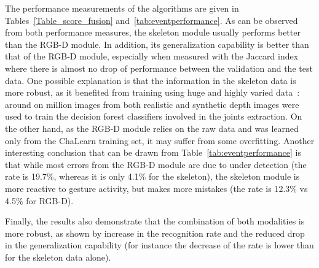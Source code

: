%
The performance measurements  of the algorithms are given in Tables~\ref{Table_score_fusion} and~\ref{tab:eventperformance}.
%
As can be observed from both performance measures, the skeleton module usually  performs better than the RGB-D module.
In addition, its generalization capability  is better than that of the RGB-D module,
especially when measured with the Jaccard index where there is almost no drop of performance between the validation and the test data.
%
One possible explanation is that the information in the skeleton data is more robust, as it benefited from training using huge and highly
varied data~\cite{shotton2011real}: around on million images from both realistic and synthetic depth images were used to train
the decision forest classifiers involved in the joints extraction.
%
On the other hand, as the  RGB-D module relies on  the raw data and was learned only from the ChaLearn training set, it may
suffer from some overfitting.
%
Another interesting conclusion that can be drawn from Table~\ref{tab:eventperformance} is that while most errors from the RGB-D module are due to under detection
(the \eventmissed rate is 19.7\%, whereas it is only 4.1\% for the skeleton), the skeleton module is more reactive to gesture activity, but makes more mistakes
(the \eventconfused rate is 12.3\% vs 4.5\% for RGB-D).


Finally, the results also demonstrate  that the combination of both modalities is more robust,
as shown by increase in the recognition rate and the reduced drop in the generalization capability
(for instance the decrease of the \eventaccuracy rate is lower than for the skeleton data alone).

